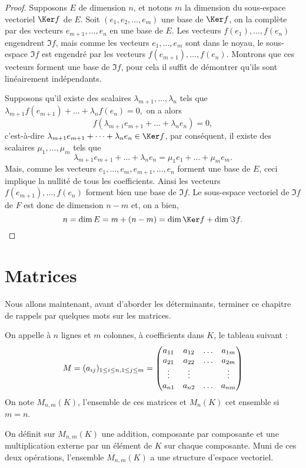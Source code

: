 \documentclass[class=report,crop=false]{standalone}
\begin{document}
\begin{proof}
Supposons $E$ de dimension $n$, et notons $m$ la dimension du sous-espace vectoriel $\Ker f$ de $E$. Soit $(e_1,e_2,\dots,e_m)$ une base de $\Ker f$, on la complète par des vecteurs $e_{m+1},\dots,e_n$ en une base de $E$. Les vecteurs $f(e_1),\dots,f(e_n)$ engendrent $\Im f$, mais comme les vecteurs $e_1,\dots,e_m$ sont dans le noyau, le sous-espace $\Im f$ est engendré par les vecteurs $f(e_{m+1}),\dots,f(e_n)$. Montrons que ces vecteurs forment une base de $\Im f$, pour cela il suffit de démontrer qu'ils sont linéairement indépendants.

Supposons qu'il existe des scalaires $\lambda_{m+1},\dots, \lambda_n$ tels que 
$\lambda_{m+1}f(e_{m+1})+\dots+\lambda_nf(e_n)=0,$ on a alors 
$$f(\lambda_{m+1}e_{m+1}+\dots+\lambda_ne_n)=0,$$
c'est-à-dire $\lambda_{m+1}e_{m+1}+\dots+\lambda_ne_n\in \Ker f$, par conséquent, il existe des scalaires $\mu_1,\dots,\mu_m$ tels que 
$$\lambda_{m+1}e_{m+1}+\dots+\lambda_ne_n=\mu_1e_1+\dots+\mu_me_m.$$
Mais, comme les vecteurs $e_1,\dots,e_m,e_{m+1},\dots,e_n$ forment une base de $E$, ceci implique la nullité de tous les coefficients. Ainsi les vecteurs $f(e_{m+1}),\dots,f(e_n)$ forment bien une base de $\Im f$. Le sous-espace vectoriel de $\Im f$ de $F$ est donc de dimension $n-m$ et, on a bien,
$$n=\dim E=m+(n-m)=\dim \Ker f+\dim \Im f.$$  
\end{proof}

   


\section{Matrices}


Nous allons maintenant, avant d'aborder les déterminants, terminer ce 
chapitre de rappels par quelques mots sur les matrices.


\begin{definition}
On appelle  à $n$ lignes et $m$ colonnes, à coefficients 
 dans $K$, le tableau suivant :
$$M=(a_{ij})_{1\leq i\leq n,1\leq j\leq m}=\left(\begin{matrix}a_{11}&a_{12}&\ldots&a_{1m}\cr
a_{21}&a_{22}&\ldots&a_{2m}\cr\vdots&\vdots& &\vdots\cr a_{n1}&a_{n2}&\ldots&a_{nm}\end{matrix}\right)$$ 
On note $M_{n,m}(K)$, l'ensemble de ces matrices et $M_n(K)$ cet ensemble si $m=n$.  
\end{definition}


On définit sur $M_{n,m}(K)$ une addition, composante par composante et une 
multiplication externe par un élément de $K$ sur chaque composante. 
Muni de ces deux opérations, l'ensemble $M_{n,m}(K)$ a une structure d'espace vectoriel.
\end{document}
